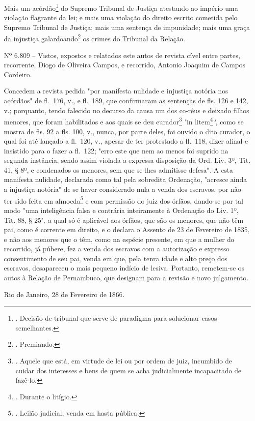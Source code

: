 Mais um acórdão\footnote{. Decisão de tribunal que serve de paradigma
  para solucionar casos semelhantes.} do Supremo Tribunal de Justiça
atestando ao império uma violação flagrante da lei; e mais uma violação
do direito escrito cometida pelo Supremo Tribunal de Justiça; mais uma
sentença de impunidade; mais uma graça da injustiça
galardoando\footnote{. Premiando.} os crimes do Tribunal da Relação.

Nº 6.809 -- Vistos, expostos e relatados este autos de revista cível
entre partes, recorrente, Diogo de Oliveira Campos, e recorrido, Antonio
Joaquim de Campos Cordeiro.

Concedem a revista pedida "por manifesta nulidade e injustiça notória
nos acórdãos" de fl.~176, v., e fl.~189, que confirmaram as sentenças de
fls. 126 e 142, v.; porquanto, tendo falecido no decurso da causa um dos
co-réus e deixado filhos menores, que foram habilitados e aos quais se
deu curador\footnote{. Aquele que está, em virtude de lei ou por ordem
  de juiz, incumbido de cuidar dos interesses e bens de quem se acha
  judicialmente incapacitado de fazê-lo.} "in litem\footnote{. Durante o
  litígio.}\emph{"}, como se mostra de fls. 92 a fls. 100, v., nunca,
por parte deles, foi ouvido o dito curador, o qual foi até lançado a
fl.~120, v., apesar de ter protestado a fl.~118, dizer afinal e
insistido para o fazer a fl.~122; "erro este que nem ao menos foi
suprido na segunda instância, sendo assim violada a expressa disposição
da Ord. Liv. 3º, Tit. 41, § 8º, e condenados os menores, sem que se lhes
admitisse defesa". A esta manifesta nulidade, declarada como tal pela
sobredita Ordenação, "acresce ainda a injustiça notória" de se haver
considerado nula a venda dos escravos, por não ter sido feita em
almoeda\footnote{. Leilão judicial, venda em hasta pública.} e com
permissão do juiz dos órfãos, dando-se por tal modo "uma inteligência
falsa e contrária inteiramente à Ordenação do Liv. 1º, Tit. 88, § 25", a
qual só é aplicável aos órfãos, que são os menores, que não têm pai,
como é corrente em direito, e o declara o Assento de 23 de Fevereiro de
1835, e não aos menores que o têm, como na espécie presente, em que a
mulher do recorrido, já púbere, fez a venda dos escravos com a
autorização e expresso consentimento de seu pai, venda em que, pela
tenra idade e alto preço dos escravos, desapareceu o mais pequeno
indício de lesiva. Portanto, remetem-se os autos à Relação de
Pernambuco, que designam para a revisão e novo julgamento.

Rio de Janeiro, 28 de Fevereiro de 1866.


